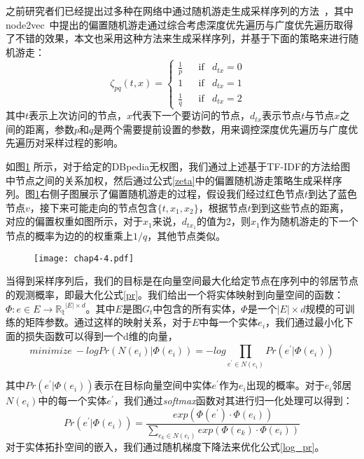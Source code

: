 \noindent 之前研究者们已经提出过多种在网络中通过随机游走生成采样序列的方法~\cite{kdd/Perozzi14, kdd/GroverL16}，其中node2vec~\cite{kdd/GroverL16}中提出的偏置随机游走通过综合考虑深度优先遍历与广度优先遍历取得了不错的效果，本文也采用这种方法来生成采样序列，并基于下面的策略来进行随机游走：
\begin{equation}
    \label{zeta}
    \zeta_{pq}(t,x) = \left\{\begin{matrix}
        \frac{1}{p} && \text{if} & d_{tx} = 0 & \\
        1           && \text{if} & d_{tx} = 1 & \\
        \frac{1}{q} && \text{if} & d_{tx} = 2 & 
        \end{matrix}\right.
\end{equation} 
\noindent 其中$t$表示上次访问的节点，$x$代表下一个要访问的节点，$d_{tx}$表示节点$t$与节点$x$之间的距离，参数$p$和$q$是两个需要提前设置的参数，用来调控深度优先遍历与广度优先遍历对采样过程的影响。

如图\ref{chap4-4} 所示，对于给定的DBpedia无权图，我们通过上述基于TF-IDF的方法给图中节点之间的关系加权，然后通过公式\ref{zeta}中的偏置随机游走策略生成采样序列。图\ref{chap4-4}右侧子图展示了偏置随机游走的过程，假设我们经过红色节点$t$到达了蓝色节点$v$，接下来可能走向的节点包含$\{t, x_1, x_2\}$，根据节点$t$到到这些节点的距离，对应的偏置权重如图所示，对于$x_1$来说，$d_{tx_1}$的值为2，则$x_1$作为随机游走的下一个节点的概率为边的的权重乘上$1/q$，其他节点类似。

\begin{figure}[!ht]
    \centerline{\texttt{[image: chap4-4.pdf]}}
    \label{chap4-4}
\end{figure}

当得到采样序列后，我们的目标是在向量空间最大化给定节点在序列中的邻居节点的观测概率，即最大化公式\ref{pr}。我们给出一个将实体映射到向量空间的函数：$\Phi: e \in E \rightarrow \mathbb{R_t}^{\left | E \right | \times d}$。其中$E$是图$G_t$中包含的所有实体，$\Phi$是一个$\left | E \right | \times d$规模的可训练的矩阵参数。通过这样的映射关系，对于$E$中每一个实体$e_i$，我们通过最小化下面的损失函数可以得到一个d维的向量，
\begin{equation}
    \label{log_pr}
    minimize\ -log Pr(N(e_i)|\Phi(e_i)) = -log\prod_{e^{'} \in N(e_i)}^{ }Pr(e^{'}|\Phi(e_i))
\end{equation}

\noindent 其中$Pr(e^{'}|\Phi(e_i))$表示在目标向量空间中实体$e^{'}$作为$e_i$出现的概率。对于$e_i$邻居$N(e_i)$中的每一个实体$e^{'}$，我们通过\emph{softmax}函数对其进行归一化处理可以得到：
\begin{equation}
    Pr(e^{'}|\Phi(e_i)) = \frac{exp(\Phi(e^{'})\cdot \Phi(e_i))}{\sum_{e_k \in N(e_i)}^{ }exp(\Phi(e_k)\cdot \Phi(e_i))}
\end{equation}
\noindent 对于实体拓扑空间的嵌入，我们通过随机梯度下降法来优化公式\ref{log_pr}。

